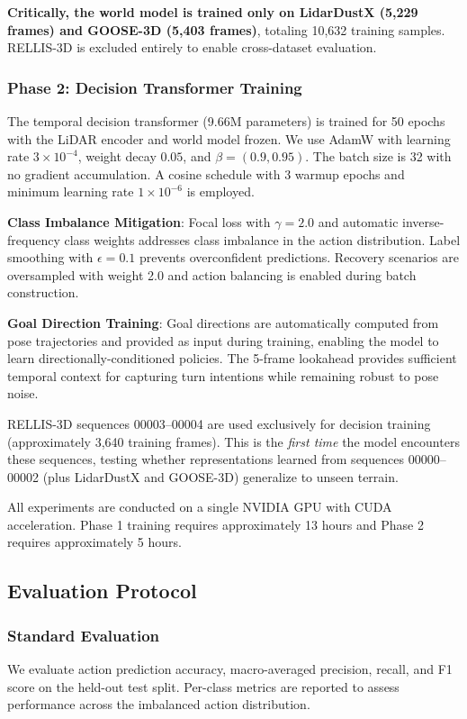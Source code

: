 \documentclass[journal]{IEEEtran}
\begin{document}
\textbf{Critically, the world model is trained only on LidarDustX (5,229 frames) and GOOSE-3D (5,403 frames)}, totaling 10,632 training samples. RELLIS-3D is excluded entirely to enable cross-dataset evaluation.

\subsubsection{Phase 2: Decision Transformer Training}
The temporal decision transformer (9.66M parameters) is trained for 50 epochs with the LiDAR encoder and world model frozen. We use AdamW with learning rate $3 \times 10^{-4}$, weight decay $0.05$, and $\beta = (0.9, 0.95)$. The batch size is 32 with no gradient accumulation. A cosine schedule with 3 warmup epochs and minimum learning rate $1 \times 10^{-6}$ is employed.

\textbf{Class Imbalance Mitigation}: Focal loss with $\gamma = 2.0$ and automatic inverse-frequency class weights addresses class imbalance in the action distribution. Label smoothing with $\epsilon = 0.1$ prevents overconfident predictions. Recovery scenarios are oversampled with weight 2.0 and action balancing is enabled during batch construction.

\textbf{Goal Direction Training}: Goal directions are automatically computed from pose trajectories and provided as input during training, enabling the model to learn directionally-conditioned policies. The 5-frame lookahead provides sufficient temporal context for capturing turn intentions while remaining robust to pose noise.

RELLIS-3D sequences 00003--00004 are used exclusively for decision training (approximately 3,640 training frames). This is the \emph{first time} the model encounters these sequences, testing whether representations learned from sequences 00000--00002 (plus LidarDustX and GOOSE-3D) generalize to unseen terrain.

All experiments are conducted on a single NVIDIA GPU with CUDA acceleration. Phase 1 training requires approximately 13 hours and Phase 2 requires approximately 5 hours.

\subsection{Evaluation Protocol}

\subsubsection{Standard Evaluation}
We evaluate action prediction accuracy, macro-averaged precision, recall, and F1 score on the held-out test split. Per-class metrics are reported to assess performance across the imbalanced action distribution.
\end{document}
